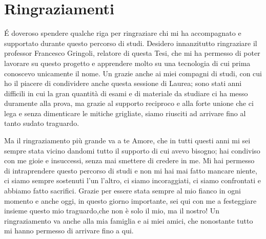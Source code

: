 \newpage

\section*{Ringraziamenti}

\'E doveroso spendere qualche riga per ringraziare chi mi ha accompagnato e supportato durante questo percorso di studi.
Desidero innanzitutto ringraziare il professor Francesco Gringoli, relatore di questa Tesi, che mi ha permesso di poter lavorare su questo progetto e apprendere molto su una tecnologia di cui prima conoscevo unicamente il nome.
Un grazie anche ai miei compagni di studi, con cui ho il piacere di condividere anche questa sessione di Laurea; sono stati anni difficili in cui la gran quantità di esami e di materiale da studiare ci ha messo duramente alla prova, ma grazie al supporto reciproco e alla forte unione che ci lega e senza dimenticare le mitiche grigliate, siamo riusciti ad arrivare fino al tanto sudato traguardo.

Ma il ringraziamento più grande va a te Amore, che in tutti questi anni mi sei sempre stata vicino dandomi tutto il supporto di cui avevo bisogno; hai condiviso con me gioie e insuccessi, senza mai smettere di credere in me. Mi hai permesso di intraprendere questo percorso di studi e non mi hai mai fatto mancare niente, ci siamo sempre sostenuti l'un l'altro, ci siamo incoraggiati, ci siamo confrontati e abbiamo fatto sacrifici. Grazie per essere stata sempre al mio fianco in ogni momento e anche oggi, in questo giorno importante, sei qui con me a festeggiare insieme questo mio traguardo,che non è solo il mio, ma il  nostro!
Un ringraziamento va anche alla mia famiglia e ai miei amici, che nonostante tutto mi hanno permesso di arrivare fino a qui.